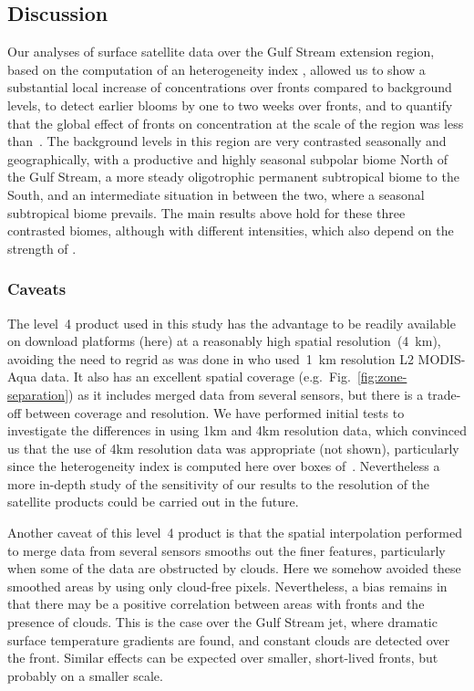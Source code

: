 \subsection{Discussion}

Our analyses of surface satellite data over the Gulf Stream extension region, based on the computation of an heterogeneity index , allowed us to show a substantial local increase of  concentrations over  fronts compared to background levels, to detect earlier blooms by one to two weeks over fronts, and to quantify that the global effect of fronts on  concentration at the scale of the region was less than~.
The background levels in this region are very contrasted seasonally and geographically, with a productive and highly seasonal subpolar biome North of the Gulf Stream, a more steady oligotrophic permanent subtropical biome to the South, and an intermediate situation in between the two, where a seasonal subtropical biome prevails.
The main results above hold for these three contrasted biomes, although with different intensities, which also depend on the strength of .

\subsubsection{Caveats}

The level~4  product used in this study has the advantage to be readily available on download platforms (here) at a reasonably high spatial resolution~(\qty{4}{\km}), avoiding the need to regrid as was done in \textcite{liu_2016} who used~\qty{1}{\km} resolution L2 MODIS-Aqua data.
It also has an excellent spatial coverage (e.g.\ Fig.~\ref{fig:zone-separation}) as it includes merged data from several sensors, but there is a trade-off between coverage and resolution.
We have performed initial tests to investigate the differences in using 1km and 4km resolution  data, which convinced us that the use of 4km resolution data was appropriate (not shown), particularly since the heterogeneity index  is computed here over boxes of~.
Nevertheless a more in-depth study of the sensitivity of our results to the resolution of the satellite products could be carried out in the future.

Another caveat of this level~4 product is that the spatial interpolation performed to merge data from several sensors smooths out the finer features, particularly when some of the data are obstructed by clouds.
Here we somehow avoided these smoothed areas by using only cloud-free  pixels.
Nevertheless, a bias remains in that there may be a positive correlation between areas with fronts and the presence of clouds.
This is the case over the Gulf Stream jet, where dramatic surface temperature gradients are found, and constant clouds are detected over the front.
Similar effects can be expected over smaller, short-lived fronts, but probably on a smaller scale.

